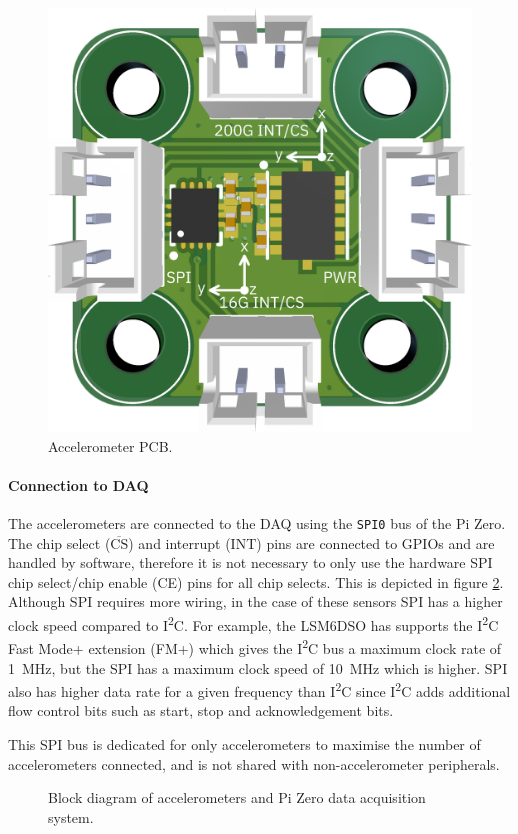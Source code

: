 \documentclass[draft]{report}
\newcommand{\textoverline}[1]{$\overline{\mbox{#1}}$}
\newcommand{\iic}{{I\textsuperscript{2}C}}
\begin{document}
\begin{figure}[H]
  \centering
  \includegraphics[width=0.5\linewidth]{images/Accelerometers_PCB.png}
  \caption{Accelerometer PCB.}
  \label{fig:accelerometers-pcb}
\end{figure}

\paragraph{Connection to DAQ}

The accelerometers are connected to the DAQ using the \texttt{SPI0} bus of the Pi Zero. The chip select (\textoverline{CS}) and interrupt (INT) pins are connected to GPIOs and are handled by software, therefore it is not necessary to only use the hardware SPI chip select/chip enable (CE) pins for all chip selects. This is depicted in figure \ref{fig:accelerometers-sch-block}. Although SPI requires more wiring, in the case of these sensors SPI has a higher clock speed compared to {\iic}. For example, the LSM6DSO has supports the {\iic} Fast Mode+ extension (FM+) which gives the {\iic} bus a maximum clock rate of \SI{1}{\mega\hertz}, but the SPI has a maximum clock speed of \SI{10}{\mega\hertz} which is higher. SPI also has higher data rate for a given frequency than {\iic} since {\iic} adds additional flow control bits such as start, stop and acknowledgement bits.

This SPI bus is dedicated for only accelerometers to maximise the number of accelerometers connected, and is not shared with non-accelerometer peripherals.

\begin{figure}[H]
  \centering
  
  \caption{Block diagram of accelerometers and Pi Zero data acquisition system.}
  \label{fig:accelerometers-sch-block}
\end{figure}
\end{document}
